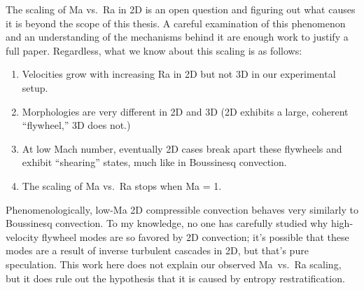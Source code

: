 \documentclass[aps, pre, onecolumn, nofootinbib, notitlepage, groupedaddress, amsfonts, amssymb, amsmath, longbibliography, superscriptaddress]{revtex4-1}
\begin{document}
The scaling of Ma vs.~Ra in 2D is an open question and figuring out what causes it is beyond the scope of this thesis.
A careful examination of this phenomenon and an understanding of the mechanisms behind it are enough work to justify a full paper.
Regardless, what we know about this scaling is as follows:
\begin{enumerate}
\item Velocities grow with increasing Ra in 2D but not 3D in our experimental setup.
\item Morphologies are very different in 2D and 3D (2D exhibits a large, coherent ``flywheel,'' 3D does not.)
\item At low Mach number, eventually 2D cases break apart these flywheels and exhibit ``shearing'' states, much like in Boussinesq convection.
\item The scaling of Ma vs.~Ra stops when Ma = 1.
\end{enumerate}
Phenomenologically, low-Ma 2D compressible convection behaves very similarly to Boussinesq convection.
To my knowledge, no one has carefully studied why high-velocity flywheel modes are so favored by 2D convection; it's possible that these modes are a result of inverse turbulent cascades in 2D, but that's pure speculation.
This work here does not explain our observed Ma~vs.~Ra scaling, but it does rule out the hypothesis that it is caused by entropy restratification.

\newpage
\end{document}
